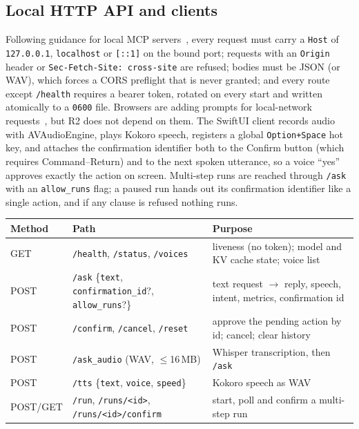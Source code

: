 \documentclass[10pt,twocolumn,letterpaper]{article}
\theoremstyle{definition}
\begin{document}
\subsection{Local HTTP API and clients}\label{sec:api}
Following guidance for local MCP servers~\cite{mcpsecurity2025}, every request must carry a
\texttt{Host} of \texttt{127.0.0.1}, \texttt{localhost} or \texttt{[::1]} on the bound port;
requests with an \texttt{Origin} header or \texttt{Sec-Fetch-Site: cross-site} are refused; bodies
must be JSON (or WAV), which forces a CORS preflight that is never granted; and every route except
\texttt{/health} requires a bearer token, rotated on every start and written atomically to a
\texttt{0600} file. Browsers are adding prompts for local-network requests~\cite{chromelna2025}, but
R2 does not depend on them. The SwiftUI client records audio with AVAudioEngine, plays Kokoro speech,
registers a global \texttt{Option+Space} hot key, and attaches the confirmation identifier both to
the Confirm button (which requires Command--Return) and to the next spoken utterance, so a voice
``yes'' approves exactly the action on screen. Multi-step runs are reached through \texttt{/ask} with
an \texttt{allow\_runs} flag; a paused run hands out its confirmation identifier like a single
action, and if any clause is refused nothing runs.

\begin{center}\small
\begin{tabular}{@{}lll@{}}
\toprule
Method & Path & Purpose \\
\midrule
GET & \texttt{/health}, \texttt{/status}, \texttt{/voices} & liveness (no token); model and KV cache state; voice list \\
POST & \texttt{/ask} \{\texttt{text}, \texttt{confirmation\_id}?, \texttt{allow\_runs}?\} & text request $\to$ reply, speech, intent, metrics, confirmation id \\
POST & \texttt{/confirm}, \texttt{/cancel}, \texttt{/reset} & approve the pending action by id; cancel; clear history \\
POST & \texttt{/ask\_audio} (WAV, $\le$16\,MB) & Whisper transcription, then \texttt{/ask} \\
POST & \texttt{/tts} \{\texttt{text}, \texttt{voice}, \texttt{speed}\} & Kokoro speech as WAV \\
POST/GET & \texttt{/run}, \texttt{/runs/<id>}, \texttt{/runs/<id>/confirm} & start, poll and confirm a multi-step run \\
\bottomrule
\end{tabular}
\end{center}
\end{document}
